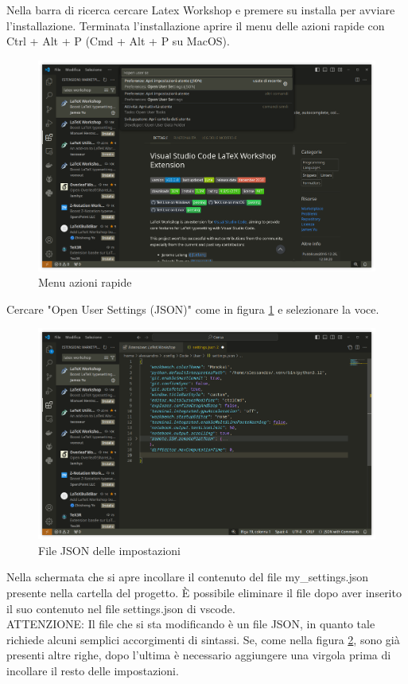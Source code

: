 \documentclass[envcountsame,envcountchap]{svmono}
\begin{document}
Nella barra di ricerca cercare Latex Workshop e premere su installa per avviare l'installazione.
Terminata l'installazione aprire il menu delle azioni rapide con Ctrl + Alt + P (Cmd + Alt + P su MacOS).
\begin{figure}[H]
    \centering
    \includegraphics[width=\linewidth]{images/vscode/vscode_user_settings.png}
    \caption{Menu azioni rapide}
    \label{menu_azioni_rapide}
\end{figure}
Cercare "Open User Settings (JSON)" come in figura \ref{menu_azioni_rapide} e selezionare la voce.
\begin{figure}[H]
    \centering
    \includegraphics[width=\linewidth]{images/vscode/vscode_settings_json.png}
    \caption{File JSON delle impostazioni}
    \label{json_impostazioni}
\end{figure}
Nella schermata che si apre incollare il contenuto del file 
my\_settings.json presente nella cartella del progetto.
È possibile eliminare il file dopo aver inserito il suo contenuto 
nel file settings.json di vscode.\\
ATTENZIONE: Il file che si sta modificando è un file JSON, in quanto
tale richiede alcuni semplici accorgimenti di sintassi.
Se, come nella figura \ref{json_impostazioni}, sono già presenti altre 
righe, dopo l'ultima è necessario aggiungere una virgola prima 
di incollare il resto delle impostazioni.
\end{document}
